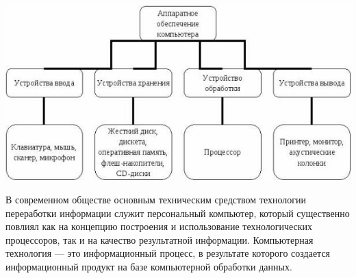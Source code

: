 \documentclass[12pt]{article}
\begin{document}
	\begin{center}
		\includegraphics{1}
	\end{center}	
	
	В современном обществе основным техническим средством технологии переработки информации служит персональный компьютер, который существенно повлиял как на концепцию построения и использование технологических процессоров, так и на качество результатной информации. Компьютерная технология --- это информационный процесс, в результате которого создается информационный продукт на базе компьютерной обработки данных.\\
		
\end{document}

